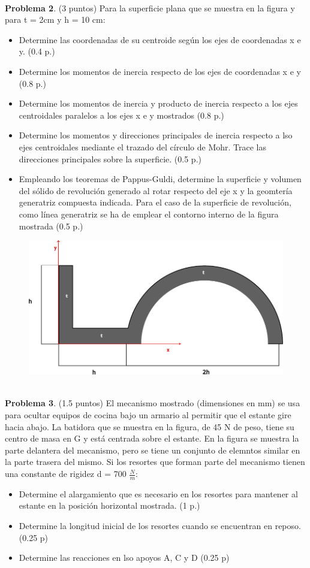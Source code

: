 \documentclass[10pt]{article}
\begin{document}
\\ 
\textbf{Problema 2}. (3 puntos) Para la superficie plana que se muestra en la figura y para t = 2cm y h = 10 cm:
\begin{itemize}
    \item Determine las coordenadas de su centroide según los ejes de coordenadas x e y. (0.4 p.)
    \item Determine los momentos de inercia respecto de los ejes de coordenadas x e y (0.8 p.)
    \item Determine los momentos de inercia y producto de inercia respecto a los ejes centroidales paralelos a los ejes x e y mostrados (0.8 p.)
    \item Determine los momentos y direcciones principales de inercia respecto a lso ejes centroidales mediante el trazado del círculo de Mohr. Trace las direcciones principales sobre la superficie. (0.5 p.)
    \item Empleando los teoremas de Pappus-Guldi, determine la superficie y volumen del sólido de revolución generado al rotar respecto del eje x y la geomtería generatriz compuesta indicada. Para el caso de la superficie de revolución, como línea generatriz se ha de emplear el contorno interno de la figura mostrada (0.5 p.)
\end{itemize}
\begin{figure}[h!]
    \centering
    \includegraphics[width=0.35\linewidth]{problema_2.pdf}
  \label{fig:}
\end{figure}
\\
\textbf{Problema 3}. (1.5 puntos) El mecanismo mostrado (dimensiones en mm) se usa para ocultar equipos de cocina bajo un armario al permitir que el estante gire hacia abajo. La batidora que se muestra en la figura, de 45 N de peso, tiene su centro de masa en G y está centrada sobre el estante. En la figura se muestra la parte delantera del mecanismo, pero se tiene un conjunto de elemntos similar en la parte trasera del mismo. Si los resortes que forman parte del mecanismo tienen una constante de rigidez d = 700 $\frac{N}{m}$:
\begin{itemize}
    \item Determine el alargamiento que es necesario en los resortes para mantener al estante en la posición horizontal mostrada. (1 p.)
    \item Determine la longitud inicial de los resortes cuando se encuentran en reposo. (0.25 p)
    \item Determine las reacciones en lso apoyos A, C y D (0.25 p)
\end{itemize}
\end{document}
